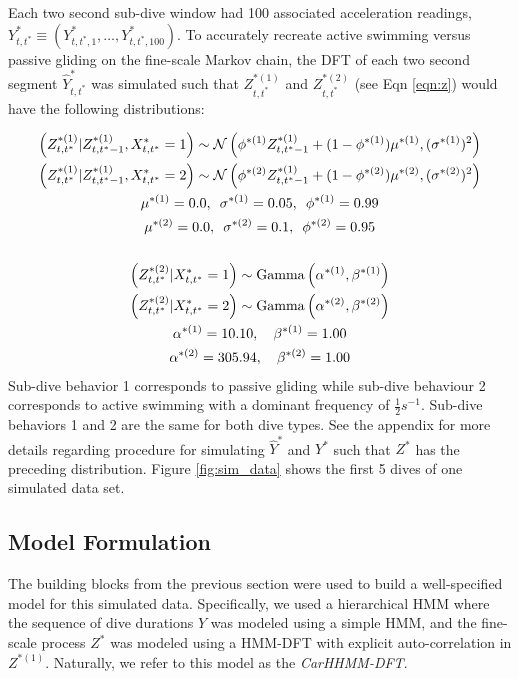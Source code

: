 Each two second sub-dive window had 100 associated acceleration readings, $Y^*_{t,t^*} \equiv \left(Y^*_{t,t^*,1}, \ldots, Y^*_{t,t^*,100}\right)$. To accurately recreate active swimming versus passive gliding on the fine-scale Markov chain, the DFT of each two second segment $\hat Y^*_{t,t^*}$ was simulated such that $Z^{*(1)}_{t,t^*}$ and $Z^{*(2)}_{t,t^*}$ (see Eqn \ref{eqn:z}) would have the following distributions: 

\begin{gather*}
    \left(Z^{*(1)}_{t,t^*} | Z^{*(1)}_{t,t^*-1}, X^*_{t,t^*} = 1 \right) \sim \mathcal{N} \left(\phi^{*(1)}Z^{*(1)}_{t,t^*-1} + (1-\phi^{*(1)})\mu^{*(1)}, (\sigma^{*(1)})^2 \right) \\
    \left(Z^{*(1)}_{t,t^*} | Z^{*(1)}_{t,t^*-1}, X^*_{t,t^*} = 2 \right) \sim \mathcal{N} \left(\phi^{*(2)}Z^{*(1)}_{t,t^*-1} + (1-\phi^{*(2)})\mu^{*(2)}, (\sigma^{*(2)})^2 \right) \\
    \mu^{*(1)} = 0.0,\enspace \sigma^{*(1)} = 0.05,\enspace \phi^{*(1)} = 0.99 \\
    \mu^{*(2)} = 0.0,\enspace \sigma^{*(2)} = 0.1,\enspace \phi^{*(2)} = 0.95 \\\\
    \left(Z^{*(2)}_{t,t^*} | X^*_{t,t^*} = 1\right) \sim {\rm{Gamma}}\left(\alpha^{*(1)}, \beta^{*(1)} \right) \\
    \left(Z^{*(2)}_{t,t^*} | X^*_{t,t^*} = 2\right) \sim {\rm{Gamma}}\left(\alpha^{*(2)}, \beta^{*(2)} \right) \\
    \alpha^{*(1)} = 10.10, \enspace \enspace \beta^{*(1)} = 1.00 \\
    \alpha^{*(2)} = 305.94, \enspace \enspace \beta^{*(2)} = 1.00
\end{gather*}
%
Sub-dive behavior 1 corresponds to passive gliding while sub-dive behaviour 2 corresponds to active swimming with a dominant frequency of $\frac{1}{2}s^{-1}$. Sub-dive behaviors 1 and 2 are the same for both dive types. See the appendix for more details regarding procedure for simulating $\hat Y^*$ and $Y^*$ such that $Z^*$ has the preceding distribution. Figure \ref{fig:sim_data} shows the first 5 dives of one simulated data set.

\subsection{Model Formulation}
\label{subsec:model_structure}

The building blocks from the previous section were used to build a well-specified model for this simulated data. Specifically, we used a hierarchical HMM where the sequence of dive durations $Y$ was modeled using a simple HMM, and the fine-scale process $Z^*$ was modeled using a HMM-DFT with explicit auto-correlation in $Z^{*(1)}$. Naturally, we refer to this model as the \textit{CarHHMM-DFT}.

